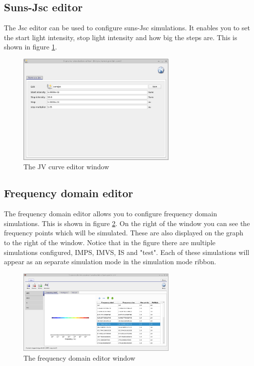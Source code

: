 \subsection{Suns-Jsc editor}
The Jsc editor can be used to configure suns-Jsc simulations. It enables you to set the start light intensity, stop light intensity and how big the steps are. This is shown in figure \ref{fig:sunsjsceditor}.

\begin{figure}[H]
\centering
\includegraphics[width=0.7\textwidth,height=0.5\textwidth]{./images/suns_jsc_editor.png}
\caption{The JV curve editor window}
\label{fig:sunsjsceditor}
\end{figure}


\subsection{Frequency domain editor}
The frequency domain editor allows you to configure frequency domain simulations. This is shown in figure \ref{fig:fxdomaineditor}. On the right of the window you can see the frequency points which will be simulated. These are also displayed on the graph to the right of the window.  Notice that in the figure there are multiple simulations configured, IMPS, IMVS, IS and "test".  Each of these simulations will appear as an separate simulation mode in the simulation mode ribbon.

\begin{figure}[H]
\centering
\includegraphics[width=0.7\textwidth,height=0.5\textwidth]{./images/fx_domain_editor.png}
\caption{The frequency domain editor window}
\label{fig:fxdomaineditor}
\end{figure}

